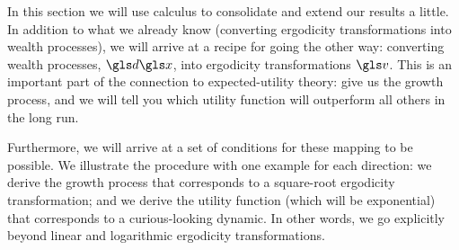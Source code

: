 In this section we will use \Ito calculus to consolidate and extend our results a little. 
%
In addition to what we already know (converting ergodicity transformations into wealth processes), we will 
arrive at a recipe for going the other way: converting wealth processes, $\gd\x$, into ergodicity transformations 
$\gv$. This is an important part of the connection to expected-utility theory: give us the growth process, 
and we will tell you which utility function will outperform all others in the long run.

Furthermore, we will arrive at a set of conditions for these mapping to be possible.
We illustrate the procedure with one example for each direction: we derive the growth process that 
corresponds to a square-root ergodicity transformation; and we derive the utility function (which will be exponential)
that corresponds to a curious-looking dynamic. In other words, we go explicitly beyond linear and logarithmic
ergodicity transformations.

